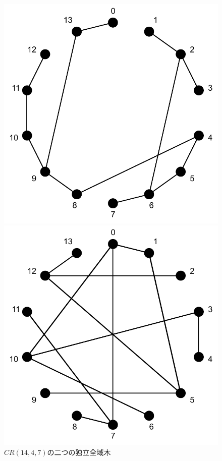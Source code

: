 \documentclass[twocolumn, 11pt]{jsarticle}
\begin{document}
        \begin{figure}[H]
            \centering
            \begin{minipage}{0.45\linewidth}
                \centering
                \includegraphics[width=\linewidth]{figures/IST1.pdf}
            \end{minipage}
            \begin{minipage}{0.45\linewidth}
                \centering
                \includegraphics[width=\linewidth]{figures/IST2.pdf}
            \end{minipage}
            \caption{$CR(14,4,7)$の二つの独立全域木}
            \label{fig:IST}
        \end{figure}
\end{document}
